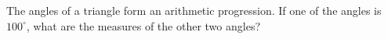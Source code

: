 The angles of a triangle form an arithmetic progression. If one of the angles is $100^\circ$, what are the measures of the other two angles?
